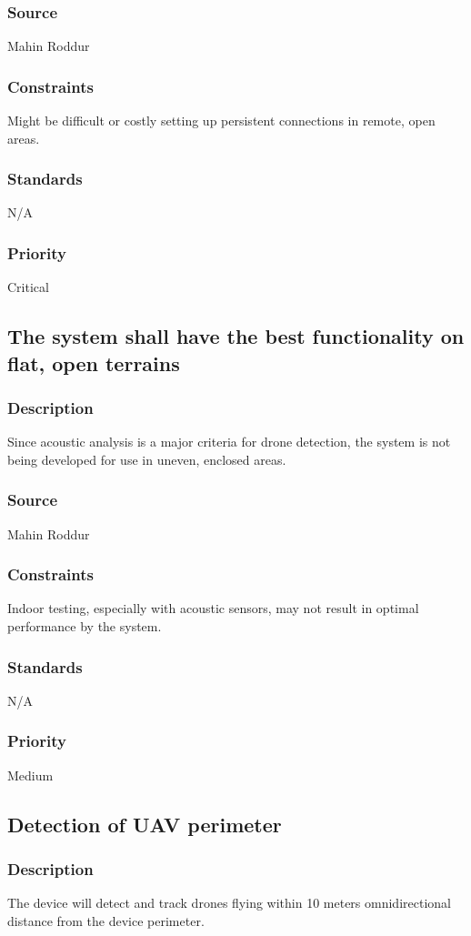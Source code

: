 \subsubsection{Source}
Mahin Roddur
\subsubsection{Constraints}
Might be difficult or costly setting up persistent connections in remote, open areas.
\subsubsection{Standards}
N/A
\subsubsection{Priority}
Critical

\subsection{The system shall have the best functionality on flat, open terrains}
\subsubsection{Description}
Since acoustic analysis is a major criteria for drone detection, the system is not being developed for use in uneven, enclosed areas.
\subsubsection{Source}
Mahin Roddur
\subsubsection{Constraints}
Indoor testing, especially with acoustic sensors, may not result in optimal performance by the system. 
\subsubsection{Standards}
N/A
\subsubsection{Priority}
Medium

\subsection{Detection of UAV perimeter}
\subsubsection{Description}
The device will detect and track drones flying within 10 meters omnidirectional distance from the device perimeter.

